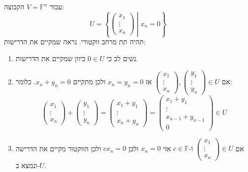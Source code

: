 \documentclass{tstextbook}
\begin{document}
\begin{example}
עבור \(V=\mathbb{F} ^{n}\) הקבוצה:
$$U=\left\{  \left.   \begin{pmatrix}x_{1} \\\vdots\\x_{n}
\end{pmatrix}   \;\right\rvert \;x_{n}=0  \right\}$$
תהיה תת מרחב ווקטורי. נראה שמקיים את הדרישות:

  \begin{enumerate}
    \item נשים לב כי \(0 \in U\) כיוון שמקיים את הדרישות. 


    \item אם \(\begin{pmatrix}x_{1}\\\vdots\\x_{n}\end{pmatrix},\begin{pmatrix}y_{1}\\\vdots\\y_{n}\end{pmatrix} \in U\)  אז \(x_{n}=y_{n}=0\) ולכן מתקיים \(x_{n}+y_{n}=0\). כלומר: 
$$\begin{pmatrix}x_{1}\\\vdots\\x_{n}\end{pmatrix}+\begin{pmatrix}y_{1}\\\vdots\\y_{n}\end{pmatrix}=\begin{pmatrix}x_{1}+y_{1}\\\vdots \\ x_{n}+y_{n}\end{pmatrix}= \begin{pmatrix}x_{1}+y_{1}\\\vdots \\ x_{n-1} + y_{n-1}\\ 0
\end{pmatrix}\in U$$


    \item אם \(\begin{pmatrix}x_{1}\\\vdots\\x_{n}\end{pmatrix}\in U\) ו-\(c \in \mathbb{F}\) אזי \(x_{n}=0\) ולכן \(cx_{n}=0\) ולכן הווקטור מקיים את הדרישה ונמצא ב-\(U\). 


  \end{enumerate}
\end{example}
\end{document}
